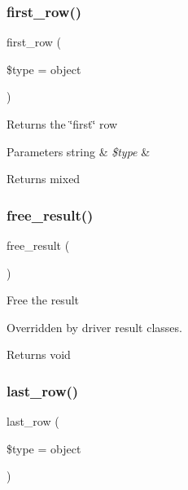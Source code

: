 \subsubsection{\texorpdfstring{first\+\_\+row()}{first\_row()}}
{\footnotesize\ttfamily first\+\_\+row (\begin{DoxyParamCaption}\item[{}]{\$type = {\ttfamily \textquotesingle{}object\textquotesingle{}} }\end{DoxyParamCaption})}

Returns the \char`\"{}first\char`\"{} row


\begin{DoxyParams}[1]{Parameters}
string & {\em \$type} & \\
\hline
\end{DoxyParams}
\begin{DoxyReturn}{Returns}
mixed 
\end{DoxyReturn}
\mbox{\label{class_c_i___d_b__result_aad2d98d6beb3d6095405356c6107b473}} 
\subsubsection{\texorpdfstring{free\+\_\+result()}{free\_result()}}
{\footnotesize\ttfamily free\+\_\+result (\begin{DoxyParamCaption}{ }\end{DoxyParamCaption})}

Free the result

Overridden by driver result classes.

\begin{DoxyReturn}{Returns}
void 
\end{DoxyReturn}
\mbox{\label{class_c_i___d_b__result_a2c420342d5b577d91b6b993be86f68c0}} 
\subsubsection{\texorpdfstring{last\+\_\+row()}{last\_row()}}
{\footnotesize\ttfamily last\+\_\+row (\begin{DoxyParamCaption}\item[{}]{\$type = {\ttfamily \textquotesingle{}object\textquotesingle{}} }\end{DoxyParamCaption})}


